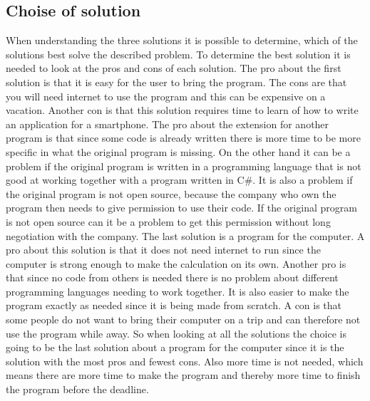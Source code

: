 \subsection{Choise of solution}
When understanding the three solutions it is possible to determine, which of the solutions best solve the described problem. To determine the best solution it is needed to look at the pros and cons of each solution. The pro about the first solution is that it is easy for the user to bring the program. The cons are that you will need internet to use the program and this can be expensive on a vacation. Another con is that this solution requires time to learn of how to write an application for a smartphone.
The pro about the extension for another program is that since some code is already written there is more time to be more specific in what the original program is missing. On the other hand it can be a problem if the original program is written in a programming language that is not good at working together with a program written in C#. It is also a problem if the original program is not open source, because the company who own the program then needs to give permission to use their code. If the original program is not open source can it be a problem to get this permission without long negotiation with the company. The last solution is a program for the computer. A pro about this solution is that it does not need internet to run since the computer is strong enough to make the calculation on its own. Another pro is that since no code from others is needed there is no problem about different programming languages needing to work together. It is also easier to make the program exactly as needed since it is being made from scratch. A con is that some people do not want to bring their computer on a trip and can therefore not use the program while away. So when looking at all the solutions the choice is going to be the last solution about a program for the computer since it is the solution with the most pros and fewest cons. Also more time is not needed, which means there are more time to make the program and thereby more time to finish the program before the deadline.